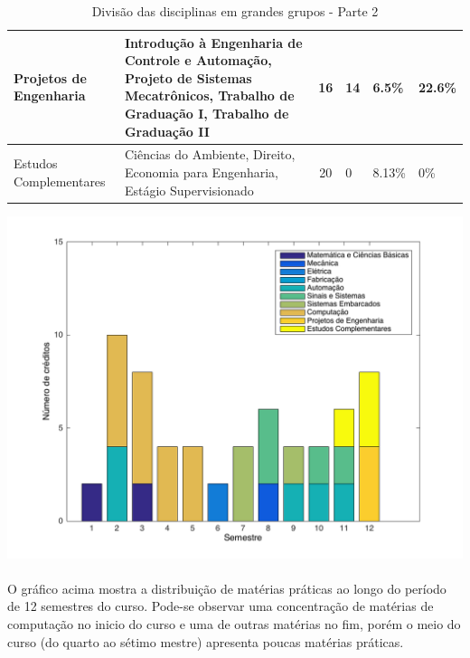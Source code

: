 \documentclass[12pt]{article} %
\begin{document}
\begin{table}[H]
{\begin{tabular}{|p{3cm}|p{7cm}|c|p{2cm}|p{2.5cm}|p{3cm}|}
Projetos de Engenharia        & {Introdução à Engenharia de Controle e Automação, Projeto de Sistemas Mecatrônicos, Trabalho de Graduação I, Trabalho de Graduação II}                                                                                                                            & 16       & 14                & 6.5\%                & 22.6\%                              \\ \hline
Estudos Complementares        & {Ciências do Ambiente, Direito, Economia para Engenharia, Estágio Supervisionado}                                                                                                                                                                                                          & 20       & 0                 & 8.13\%               & 0\%                                 \\ \hline
\end{tabular}
}
\caption{Divisão das disciplinas em grandes grupos - Parte 2}
\label{div2}
\end{table}


\includegraphics[scale=0.30]{pictures/graficoMaterias.png}\\


\paragraph{} O gráfico acima mostra a distribuição de matérias práticas ao longo do período de 12 semestres do curso. Pode-se observar uma concentração de matérias de computação no inicio do curso e uma de outras matérias no fim, porém o meio do curso (do quarto ao sétimo mestre) apresenta poucas matérias práticas.
\end{document}
